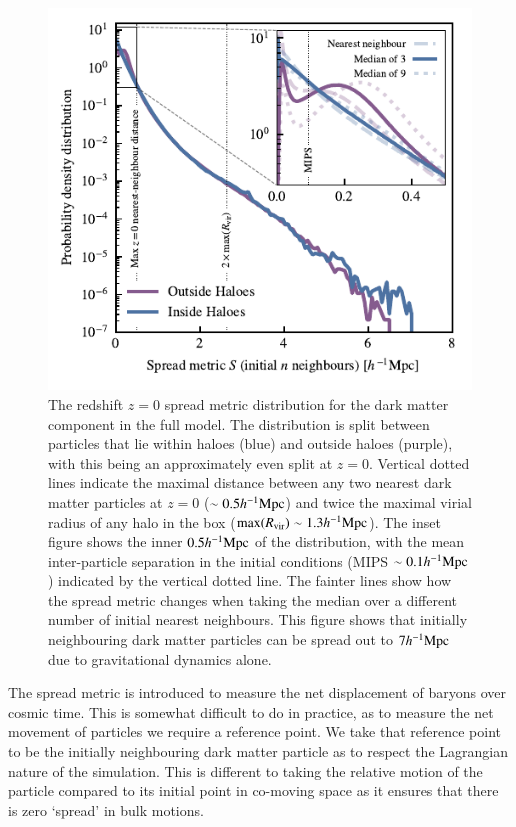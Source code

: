 \begin{figure}
    \centering
    \includegraphics{figures/s50j7kAHF/dark_matter_distance_figure_s50j7k_AHF_updated.pdf}
    \vspace{-0.7cm}
    \caption{The redshift $z=0$ spread metric distribution for the dark
    matter component in the full \simba{} model. The distribution is split
    between particles that lie within haloes (blue) and outside haloes
    (purple), with this being an approximately even split at $z=0$. Vertical
    dotted lines indicate the maximal distance between any two nearest dark
    matter particles at $z=0$ ($\sim 0.5h^{-1}{\rm Mpc}{}$) and twice the maximal
    virial radius of any halo in the box (${\rm max}(R_{\rm vir}) \sim
    1.3h^{-1}{\rm Mpc}{}$). The inset figure shows the inner $0.5h^{-1}{\rm Mpc}{}$ of the
    distribution, with the mean inter-particle separation in the initial
    conditions (MIPS $\sim 0.1h^{-1}{\rm Mpc}$) indicated by the vertical dotted line.
    The fainter lines show how the spread metric changes when taking the
    median over a different number of initial nearest neighbours.
    This figure shows that initially neighbouring dark matter particles
    can be spread out to $7h^{-1}{\rm Mpc}{}$ due to gravitational dynamics alone.}
    \label{fig:dmonlyspread}
\end{figure}


The spread metric is introduced to measure the net displacement of baryons over
cosmic time. This is somewhat difficult to do in practice, as to measure the
net movement of particles we require a reference point. We take that
reference point to be the initially neighbouring dark matter particle as to
respect the Lagrangian nature of the simulation. This is different to taking the
relative motion of the particle compared to its initial point in co-moving space
as it ensures that there is zero `spread' in bulk motions.

